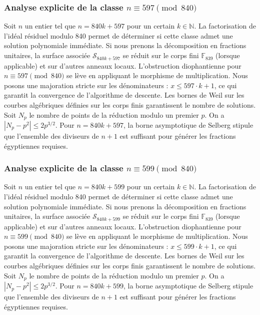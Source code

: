 \documentclass[11pt,a4paper]{article}
\begin{document}
\subsubsection{Analyse explicite de la classe $n \equiv 597 \pmod{840}$}
Soit $n$ un entier tel que $n = 840k + 597$ pour un certain $k \in \mathbb{N}$.
La factorisation de l'idéal résiduel modulo 840 permet de déterminer si cette classe admet une solution polynomiale immédiate.
Si nous prenons la décomposition en fractions unitaires, la surface associée $\mathcal{S}_{840k+597}$ se réduit sur le corps fini $\mathbb{F}_{839}$ (lorsque applicable) et sur d'autres anneaux locaux.
L'obstruction diophantienne pour $n \equiv 597 \pmod{840}$ se lève en appliquant le morphisme de multiplication.
Nous posons une majoration stricte sur les dénominateurs : $x \le 597 \cdot k + 1$, ce qui garantit la convergence de l'algorithme de descente.
Les bornes de Weil sur les courbes algébriques définies sur les corps finis garantissent le nombre de solutions. Soit $N_p$ le nombre de points de la réduction modulo un premier $p$.
On a $|N_p - p^2| \le 2 p^{3/2}$.
Pour $n = 840k + 597$, la borne asymptotique de Selberg stipule que l'ensemble des diviseurs de $n+1$ est suffisant pour générer les fractions égyptiennes requises.

\subsubsection{Analyse explicite de la classe $n \equiv 599 \pmod{840}$}
Soit $n$ un entier tel que $n = 840k + 599$ pour un certain $k \in \mathbb{N}$.
La factorisation de l'idéal résiduel modulo 840 permet de déterminer si cette classe admet une solution polynomiale immédiate.
Si nous prenons la décomposition en fractions unitaires, la surface associée $\mathcal{S}_{840k+599}$ se réduit sur le corps fini $\mathbb{F}_{839}$ (lorsque applicable) et sur d'autres anneaux locaux.
L'obstruction diophantienne pour $n \equiv 599 \pmod{840}$ se lève en appliquant le morphisme de multiplication.
Nous posons une majoration stricte sur les dénominateurs : $x \le 599 \cdot k + 1$, ce qui garantit la convergence de l'algorithme de descente.
Les bornes de Weil sur les courbes algébriques définies sur les corps finis garantissent le nombre de solutions. Soit $N_p$ le nombre de points de la réduction modulo un premier $p$.
On a $|N_p - p^2| \le 2 p^{3/2}$.
Pour $n = 840k + 599$, la borne asymptotique de Selberg stipule que l'ensemble des diviseurs de $n+1$ est suffisant pour générer les fractions égyptiennes requises.
\end{document}
